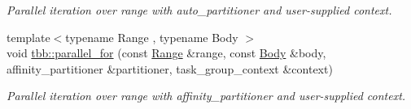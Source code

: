 \begin{DoxyCompactItemize}
\begin{DoxyCompactList}\small\item\em Parallel iteration over range with auto\+\_\+partitioner and user-\/supplied context. \end{DoxyCompactList}\item 
{\footnotesize template$<$typename Range , typename Body $>$ }\\void \hyperlink{group__algorithms_ga62b1a9ac304ba1eb4f87ab8cc18dd281}{tbb\+::parallel\+\_\+for} (const \hyperlink{classtbb_1_1blocked__range}{Range} \&range, const \hyperlink{classBody}{Body} \&body, affinity\+\_\+partitioner \&partitioner, task\+\_\+group\+\_\+context \&context)
\begin{DoxyCompactList}\small\item\em Parallel iteration over range with affinity\+\_\+partitioner and user-\/supplied context. \end{DoxyCompactList}\end{DoxyCompactItemize}
